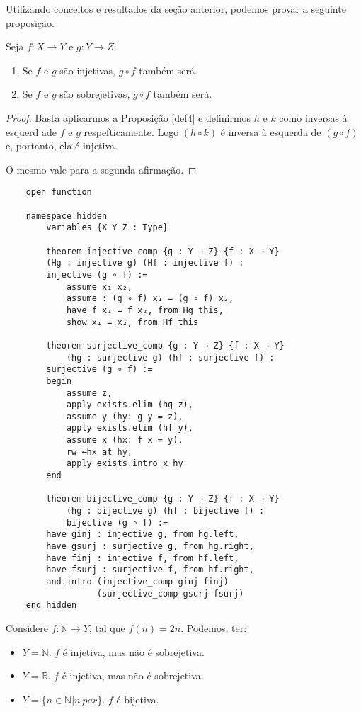 Utilizando conceitos e resultados da seção anterior, podemos provar a seguinte proposição.

\begin{theorem}
    Seja $f: X \to Y$ e $g: Y \to Z$. 
    \renewcommand{\labelenumi}{\Roman{enumi}}
    \begin{enumerate}
        \item Se $f$ e $g$ são injetivas, $g \circ f$ também será.
        \item Se $f$ e $g$ são sobrejetivas, $g \circ f$ também será.
    \end{enumerate}
\end{theorem}

\begin{proof}
    Basta aplicarmos a Proposição \ref{def4} e definirmos $h$ e $k$ como 
    inversas à esquerd ade $f$ e $g$ respefticamente. Logo $(h \circ k)$ 
    é inversa à esquerda de  $(g \circ f)$ e, portanto, ela é injetiva. 

    O mesmo vale para a segunda afirmação.
\end{proof} 

\begin{lstlisting}
    open function

    namespace hidden
        variables {X Y Z : Type}

        theorem injective_comp {g : Y → Z} {f : X → Y}
        (Hg : injective g) (Hf : injective f) :
        injective (g ∘ f) :=
            assume x₁ x₂,
            assume : (g ∘ f) x₁ = (g ∘ f) x₂,
            have f x₁ = f x₂, from Hg this,
            show x₁ = x₂, from Hf this

        theorem surjective_comp {g : Y → Z} {f : X → Y}
            (hg : surjective g) (hf : surjective f) :
        surjective (g ∘ f) :=
        begin
            assume z, 
            apply exists.elim (hg z),
            assume y (hy: g y = z),
            apply exists.elim (hf y),
            assume x (hx: f x = y),
            rw ←hx at hy,
            apply exists.intro x hy
        end

        theorem bijective_comp {g : Y → Z} {f : X → Y}
            (hg : bijective g) (hf : bijective f) : 
            bijective (g ∘ f) :=
        have ginj : injective g, from hg.left,
        have gsurj : surjective g, from hg.right, 
        have finj : injective f, from hf.left,
        have fsurj : surjective f, from hf.right,
        and.intro (injective_comp ginj finj) 
                  (surjective_comp gsurj fsurj)
    end hidden       
\end{lstlisting}

\begin{example}
    Considere $f: \mathbb{N} \to Y$, tal que $f(n) = 2n$. Podemos, ter:
    \begin{itemize}
        \item $Y = \mathbb{N}$. $f$ é injetiva, mas não é sobrejetiva. 
        \item $Y = \mathbb{R}$. $f$ é injetiva, mas não é sobrejetiva.
        \item $Y = \{n \in \mathbb{N} | n~par\}$. $f$ é bijetiva. 
    \end{itemize} 
\end{example}